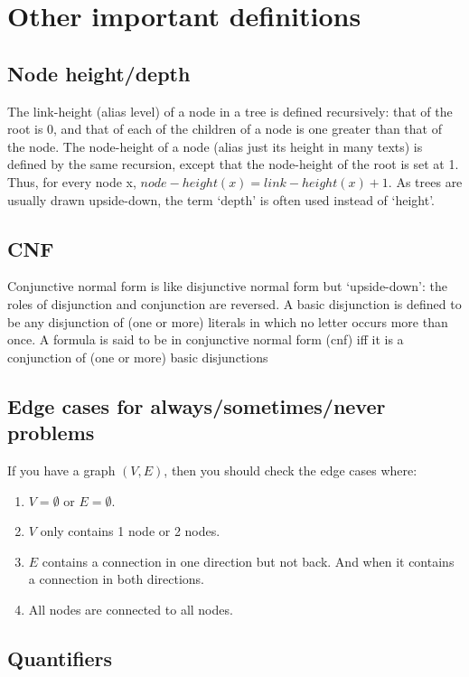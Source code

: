\documentclass[twocolumn,a4paper]{article}
\begin{document}
\newpage
\section*{Other important definitions}
\subsection*{Node height/depth}
The link-height (alias level) of a node in a tree is defined recursively: that of the root is 0,
and that of each of the children of a node is one greater than that of the node.
The node-height of a node (alias just its height in many texts) is defined by the same recursion,
except that the node-height of the root is set at 1.
Thus, for every node x, \(node-height(x) = link-height(x) + 1\).
As trees are usually drawn upside-down, the term `depth' is often used instead of `height'.

\subsection{CNF}
Conjunctive normal form is like disjunctive normal form but ‘upside-down’: the roles of disjunction and conjunction are reversed. 
A basic disjunction is defined to be any disjunction of (one or more) literals in which no letter occurs more than once.
A formula is said to be in conjunctive normal form (cnf) iff it is a conjunction of (one or more) basic disjunctions

\subsection*{Edge cases for always/sometimes/never problems}
If you have a graph \((V, E)\), then you should check the edge cases where:
\begin{enumerate}
	\item \(V=\emptyset \) or \(E=\emptyset \).
	\item \(V\) only contains 1 node or 2 nodes.
	\item \(E\) contains a connection in one direction but not back. And when it contains a connection in both directions.
	\item All nodes are connected to all nodes.
\end{enumerate}

\subsection*{Quantifiers}
\end{document}
